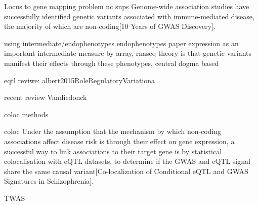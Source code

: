 \begin{outline}

\1 Locus to gene mapping problem
    \2 nc snps
        \3 Genome-wide association studies have successfully identified genetic variants associated with immune-mediated disease, the majority of which are non-coding[10 Years of GWAS Discovery].


\1 using intermediate/endophenotypes
    \2 endophenotypes paper
    \2 expression as an important intermediate
        \3 measure by array, rnaseq 
    \2 theory is that genetic variants manifest their effects through these phenotypes, central dogma based

    \1 eqtl reviwe: albert2015RoleRegulatoryVariationa

    recent review
    Vandiedonck

\1 coloc methods

    \2 coloc
        \3 Under the assumption that the mechanism by which non-coding associations affect disease risk is through their effect on gene expression, a successful way to link associations to their target gene is by statistical colocalisation with eQTL datasets, to determine if the GWAS and eQTL signal share the same causal variant[Co-localization of Conditional eQTL and GWAS Signatures in Schizophrenia].

    \2 TWAS


\end{outline}
